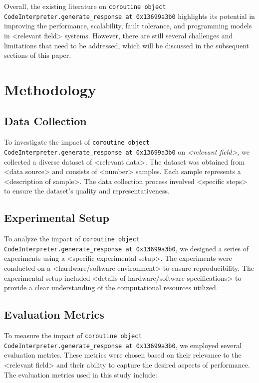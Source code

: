 \documentclass{article}
\begin{document}
Overall, the existing literature on \texttt{coroutine object CodeInterpreter.generate\_response at 0x13699a3b0} highlights its potential in improving the performance, scalability, fault tolerance, and programming models in <relevant field> systems. However, there are still several challenges and limitations that need to be addressed, which will be discussed in the subsequent sections of this paper.
\section{Methodology}

\subsection{Data Collection}

To investigate the impact of \texttt{coroutine object CodeInterpreter.generate\_response at 0x13699a3b0} on \textit{<relevant field>}, we collected a diverse dataset of <relevant data>. The dataset was obtained from <data source> and consists of <number> samples. Each sample represents a <description of sample>. The data collection process involved <specific steps> to ensure the dataset's quality and representativeness.

\subsection{Experimental Setup}

To analyze the impact of \texttt{coroutine object CodeInterpreter.generate\_response at 0x13699a3b0}, we designed a series of experiments using a <specific experimental setup>. The experiments were conducted on a <hardware/software environment> to ensure reproducibility. The experimental setup included <details of hardware/software specifications> to provide a clear understanding of the computational resources utilized.

\subsection{Evaluation Metrics}

To measure the impact of \texttt{coroutine object CodeInterpreter.generate\_response at 0x13699a3b0}, we employed several evaluation metrics. These metrics were chosen based on their relevance to the <relevant field> and their ability to capture the desired aspects of performance. The evaluation metrics used in this study include:
\end{document}
